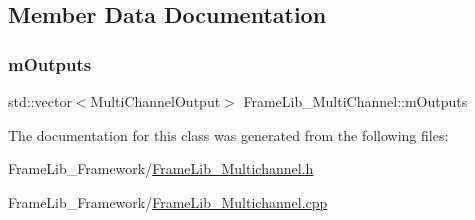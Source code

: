 \subsection{Member Data Documentation}
\mbox{\label{class_frame_lib___multi_channel_a2d993bc32c4625a1adbd84997c5d74f2}} 
\subsubsection{\texorpdfstring{m\+Outputs}{mOutputs}}
{\footnotesize\ttfamily std\+::vector$<$Multi\+Channel\+Output$>$ Frame\+Lib\+\_\+\+Multi\+Channel\+::m\+Outputs\hspace{0.3cm}{\ttfamily [protected]}}



The documentation for this class was generated from the following files\+:\begin{DoxyCompactItemize}
\item 
Frame\+Lib\+\_\+\+Framework/\hyperlink{_frame_lib___multichannel_8h}{Frame\+Lib\+\_\+\+Multichannel.\+h}\item 
Frame\+Lib\+\_\+\+Framework/\hyperlink{_frame_lib___multichannel_8cpp}{Frame\+Lib\+\_\+\+Multichannel.\+cpp}\end{DoxyCompactItemize}

